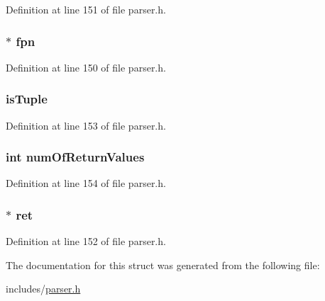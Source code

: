 Definition at line 151 of file parser.\+h.

\hypertarget{structfunction__ast__node_a7aa08eb03840d9cd4a00eceb4a33651e}{
\subsubsection[{fpn}]{$\ast$ fpn}}\label{structfunction__ast__node_a7aa08eb03840d9cd4a00eceb4a33651e}


Definition at line 150 of file parser.\+h.

\hypertarget{structfunction__ast__node_a5f5d542e1e598f0aa87a26386f88346a}{
\subsubsection[{is\+Tuple}]{ is\+Tuple}}\label{structfunction__ast__node_a5f5d542e1e598f0aa87a26386f88346a}


Definition at line 153 of file parser.\+h.

\hypertarget{structfunction__ast__node_a53a6c9388097639e5b67cd4b368f98d1}{
\subsubsection[{num\+Of\+Return\+Values}]{\setlength{\rightskip}{0pt plus 5cm}int num\+Of\+Return\+Values}}\label{structfunction__ast__node_a53a6c9388097639e5b67cd4b368f98d1}


Definition at line 154 of file parser.\+h.

\hypertarget{structfunction__ast__node_a064a5f35fdc8f72e5ff6b9b68d8b4514}{
\subsubsection[{ret}]{$\ast$ ret}}\label{structfunction__ast__node_a064a5f35fdc8f72e5ff6b9b68d8b4514}


Definition at line 152 of file parser.\+h.



The documentation for this struct was generated from the following file\+:\begin{DoxyCompactItemize}
\item 
includes/\hyperlink{parser_8h}{parser.\+h}\end{DoxyCompactItemize}
